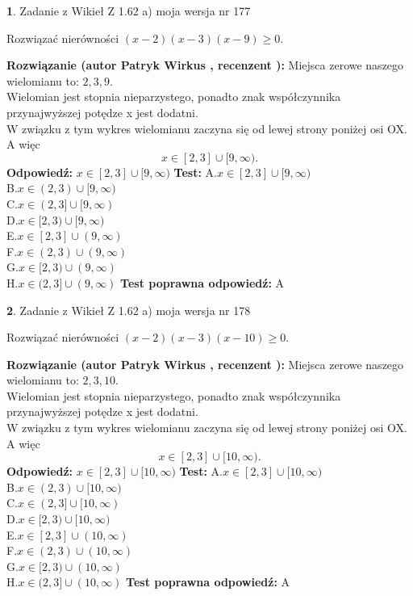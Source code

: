 \documentclass[12pt, a4paper]{article}
\theoremstyle{definition} %
\newtheorem{zad}{}
\newcommand{\zadStart}[1]{\begin{zad}#1\newline}
\newcommand{\zadStop}{\end{zad}}
\newcommand{\rozwStart}[2]{\noindent \textbf{Rozwiązanie (autor #1 , recenzent #2): }\newline}
\newcommand{\rozwStop}{\newline}
\newcommand{\odpStart}{\noindent \textbf{Odpowiedź:}\newline}
\newcommand{\odpStop}{\newline}
\newcommand{\testStart}{\noindent \textbf{Test:}\newline}
\newcommand{\testStop}{\newline}
\newcommand{\kluczStart}{\noindent \textbf{Test poprawna odpowiedź:}\newline}
\newcommand{\kluczStop}{\newline}
\begin{document}
\zadStart{Zadanie z Wikieł Z 1.62 a) moja wersja nr 177}

Rozwiązać nierówności $(x-2)(x-3)(x-9)\ge0$.
\zadStop
\rozwStart{Patryk Wirkus}{}
Miejsca zerowe naszego wielomianu to: $2, 3, 9$.\\
Wielomian jest stopnia nieparzystego, ponadto znak współczynnika przy\linebreak najwyższej potędze x jest dodatni.\\ W związku z tym wykres wielomianu zaczyna się od lewej strony poniżej osi OX. A więc $$x \in [2,3] \cup [9,\infty).$$
\rozwStop
\odpStart
$x \in [2,3] \cup [9,\infty)$
\odpStop
\testStart
A.$x \in [2,3] \cup [9,\infty)$\\
B.$x \in (2,3) \cup [9,\infty)$\\
C.$x \in (2,3] \cup [9,\infty)$\\
D.$x \in [2,3) \cup [9,\infty)$\\
E.$x \in [2,3] \cup (9,\infty)$\\
F.$x \in (2,3) \cup (9,\infty)$\\
G.$x \in [2,3) \cup (9,\infty)$\\
H.$x \in (2,3] \cup (9,\infty)$
\testStop
\kluczStart
A
\kluczStop



\zadStart{Zadanie z Wikieł Z 1.62 a) moja wersja nr 178}

Rozwiązać nierówności $(x-2)(x-3)(x-10)\ge0$.
\zadStop
\rozwStart{Patryk Wirkus}{}
Miejsca zerowe naszego wielomianu to: $2, 3, 10$.\\
Wielomian jest stopnia nieparzystego, ponadto znak współczynnika przy\linebreak najwyższej potędze x jest dodatni.\\ W związku z tym wykres wielomianu zaczyna się od lewej strony poniżej osi OX. A więc $$x \in [2,3] \cup [10,\infty).$$
\rozwStop
\odpStart
$x \in [2,3] \cup [10,\infty)$
\odpStop
\testStart
A.$x \in [2,3] \cup [10,\infty)$\\
B.$x \in (2,3) \cup [10,\infty)$\\
C.$x \in (2,3] \cup [10,\infty)$\\
D.$x \in [2,3) \cup [10,\infty)$\\
E.$x \in [2,3] \cup (10,\infty)$\\
F.$x \in (2,3) \cup (10,\infty)$\\
G.$x \in [2,3) \cup (10,\infty)$\\
H.$x \in (2,3] \cup (10,\infty)$
\testStop
\kluczStart
A
\kluczStop
\end{document}
